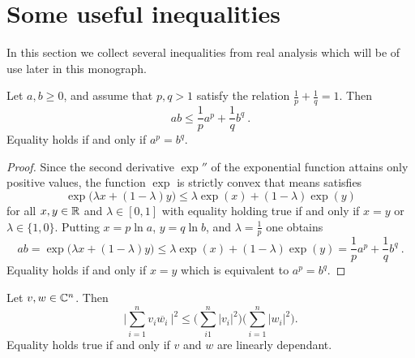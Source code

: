 %
\section{Some useful inequalities}
\label{sec:useful-inequalities}
%
%
In this section we collect several inequalities from real analysis which will 
be of use later in this monograph. 
\begin{theorem}
\label{thm:Youngs-inequality}
Let $a,b \geq 0$, and assume that $p,q >1$ satisfy the relation $\frac 1p + \frac 1q =1$. Then 
\[
   ab \leq \frac 1p a^p + \frac 1q b^q \: .
\]
  Equality holds if and only if $a^p = b^q$. 
\end{theorem}
\begin{proof}
Since the second derivative $\exp''$ of the exponential function attains
only positive values, the function $\exp$ is strictly convex that means satisfies
\[
   \exp \big( \lambda x + (1-\lambda) y \big) \leq 
   \lambda \exp ( x ) +   (1-\lambda)  \exp ( y ) 
\]
for all $x,y\in \mathbb{R}$ and $\lambda \in [0,1]$ with equality holding true if and only if $x = y$ or $\lambda \in \{ 1,0 \}$.
Putting $x = p \ln a$, $y = q \ln b$, and $\lambda = \frac 1p$ one obtains
\[
   ab = \exp\big( \lambda x + (1-\lambda) y \big)   \leq 
   \lambda \exp ( x ) +   (1-\lambda)  \exp ( y ) = \frac 1p a^p + \frac 1q b^q \: .
\]
Equality holds if and only if $x = y$ which is equivalent to  $a^p = b^q$.
\end{proof}
\begin{theorem}
\label{thm:Cauchy-Schwartz-inequality-for-sums}
Let $v,w \in \mathbb{C}^n$. Then 
\[
  \Big| \sum_{i=1}^n v_i \overline{w_i} \: \Big|^2 \leq \Big( \sum_{i1}^n |v_i|^2 \Big)  \Big( \sum_{i=1}^n |w_i|^2 \Big).
\]  
Equality holds true if and only if  $v$ and $w$ are linearly dependant. 
\end{theorem}
